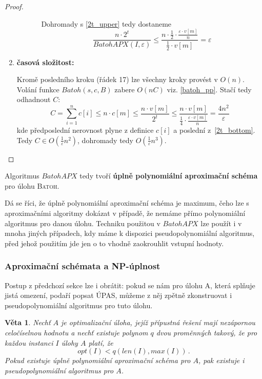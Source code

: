 \documentclass[11pt]{report} %
\newtheorem{theorem}{Věta}[section]
\numberwithin{equation}{section}
\begin{document}
\begin{proof}
\begin{enumerate}
\begin{enumerate}
\begin{enumerate}
		Dohromady s \ref{2t_upper} tedy dostaneme
		\begin{equation*}
		\frac{n\cdot 2^t}{BatohAPX(I, \varepsilon)} \leq \frac{n \cdot \frac{1}{2} \cdot \frac{\varepsilon\cdot v[m]}{n}}{\frac{1}{2} \cdot v[m]} = \varepsilon
		\end{equation*}
	\end{enumerate}

	
	
\end{enumerate}

\item \textbf{časová složitost:}

Kromě posledního kroku (řádek 17) lze všechny kroky provést v $O(n)$. Volání funkce $Batoh(s,c,B)$ zabere $O(nC)$ viz. \ref{batoh_pp}. Stačí tedy odhadnout $C$:
\begin{equation*}
	C = \sum\limits_{i=1}^{n} c[i] \leq n \cdot c[m] \leq \frac{n \cdot v[m]}{2^t} \leq \frac{n \cdot v[m]}{\frac{1}{4}\cdot \frac{\varepsilon \cdot v[m]}{n}} = \frac{4n^2}{\varepsilon}
\end{equation*}
kde předposlední nerovnost plyne z definice $c[i]$ a poslední z~\ref{2t_bottom}. Tedy $C \in O(\frac{1}{\varepsilon}n^2)$, dohromady tedy $O(\frac{1}{\varepsilon}n^3)$.
\end{enumerate}

\end{proof}

Algoritmus $BatohAPX$ tedy tvoří \textbf{úplně polynomiální aproximační schéma} pro úlohu \textsc{Batoh}. 

Dá se říci, že úplně polynomiální aproximační schéma je maximum, čeho lze s aproximačními algoritmy dokázat v případě, že nemáme přímo polynomiální algoritmus pro danou úlohu. Techniku použitou v $BatohAPX$ lze použít i v mnoha jiných
případech, kdy máme k dispozici pseudopolynomiální algoritmus, před jehož použitím jde jen o to vhodně zaokrouhlit vstupní hodnoty.

\subsubsection{Aproximační schémata a NP-úplnost}
Postup z předchozí sekce lze i obrátit: pokud se nám pro úlohu A, která splňuje jistá omezení, podaří popsat ÚPAS, můžeme z něj zpětně zkonstruovat i pseudopolynomiální algoritmus pro tuto úlohu.

\begin{theorem}
\label{apx_np}
Nechť $A$ je optimalizační úloha, jejíž přípustná řešení mají nezápornou celočíselnou hodnotu a nechť existuje polynom $q$ dvou proměnných takový, že pro každou instanci $I$ úlohy $A$ platí, že
$$opt(I) < q(len(I), max(I))\,.$$
Pokud existuje úplně polynomiální aproximační schéma pro $A$, pak existuje i pseudopolynomiální algoritmus pro $A$.
\end{theorem}
\end{document}
